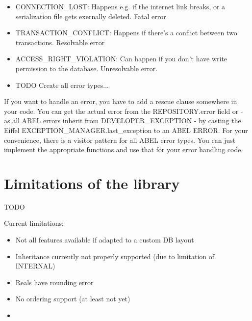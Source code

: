 \begin{itemize}
\item CONNECTION\_LOST: Happens e.g. if the internet link breaks, or a serialization file gets exernally deleted. Fatal error
\item TRANSACTION\_CONFLICT: Happens if there's a conflict between two transactions. Resolvable error
\item ACCESS\_RIGHT\_VIOLATION: Can happen if you don't have write permission to the database. Unresolvable error.
\item TODO Create all error types... 
\end{itemize}

If you want to handle an error, you have to add a rescue clause somewhere in your code. 
You can get the actual error from the REPOSITORY.error field or - as all ABEL errors inherit from DEVELOPER\_EXCEPTION - by casting the Eiffel EXCEPTION\_MANAGER.last\_exception to an ABEL ERROR.
For your convenience, there is a visitor pattern for all ABEL error types. You can just implement the appropriate functions and use that for your error handling code.


\section{Limitations of the library}
TODO

Current limitations:
\begin{itemize}
\item Not all features available if adapted to a custom DB layout 
\item Inheritance currently not properly supported (due to limitation of INTERNAL)
\item Reals have rounding error
\item No ordering support (at least not yet)
\item
\end{itemize}


